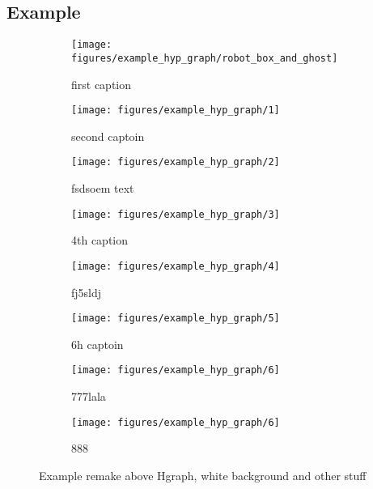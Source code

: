 \subsection{Example}%
\label{subsec:hgraph_example}
\begin{figure}[H]
    \centering

    \begin{subfigure}{.49\textwidth}
    \centering
    \texttt{[image: figures/example\_hyp\_graph/robot\_box\_and\_ghost]}
    \caption{first caption}%
    \end{subfigure}
    \hfill
    \begin{subfigure}{.49\textwidth}
    \centering
    \texttt{[image: figures/example\_hyp\_graph/1]}
    \caption{second captoin}%
    \end{subfigure}

    \begin{subfigure}{.49\textwidth}
    \centering
    \texttt{[image: figures/example\_hyp\_graph/2]}
    \caption{fsdsoem text}%
    \end{subfigure}
    \hfill
    \begin{subfigure}{.49\textwidth}
    \centering
    \texttt{[image: figures/example\_hyp\_graph/3]}
    \caption{4th caption}%
    \end{subfigure}

    \begin{subfigure}{.49\textwidth}
    \centering
    \texttt{[image: figures/example\_hyp\_graph/4]}
    \caption{fj5sldj}%
    \end{subfigure}
    \hfill
    \begin{subfigure}{.49\textwidth}
    \centering
    \texttt{[image: figures/example\_hyp\_graph/5]}
    \caption{6h captoin}%
    \end{subfigure}

    \begin{subfigure}{.49\textwidth}
    \centering
    \texttt{[image: figures/example\_hyp\_graph/6]}
    \caption{777lala}%
    \end{subfigure}
    \hfill
    \begin{subfigure}{.49\textwidth}
    \centering
    \texttt{[image: figures/example\_hyp\_graph/6]}
    \caption{888}%
    \end{subfigure}

    \caption{Example remake above Hgraph, white background and other stuff}%
    \label{fig:blocked_path_example_environment}
\end{figure}

